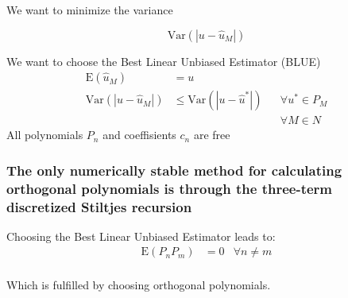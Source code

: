 \documentclass[handout]{beamer}
\newcommand{\E}[1]{\mbox{E}\!\left(#1\right)}
\newcommand{\Var}[1]{\mbox{Var}\!\left(#1\right)}
\begin{document}
%
%


\begin{frame}
  \frametitle{}

We want to minimize the variance

\[ \Var{|u - \hat u_M|}\]

We want to choose the Best Linear Unbiased Estimator (BLUE)
\begin{align*}
    \E{\hat u_M} &= u\\
    \Var{|u - \hat u_M|} &\leq \Var{|u - \hat u^*|} &    &\forall  u^* \in P_M\\
    &&& \forall M \in N
\end{align*}
    All polynomials $P_n$ and coeffisients $c_n$ are free
\end{frame}



\begin{frame}
    \frametitle{The only numerically stable method for calculating orthogonal polynomials is through the three-term discretized Stiltjes recursion}
    Choosing the Best Linear Unbiased Estimator leads to:
\begin{align*}
\E{P_nP_m} &= 0  & \forall n \neq m\\
\end{align*}

Which is fulfilled by choosing orthogonal polynomials.
\end{frame}


\end{document}
